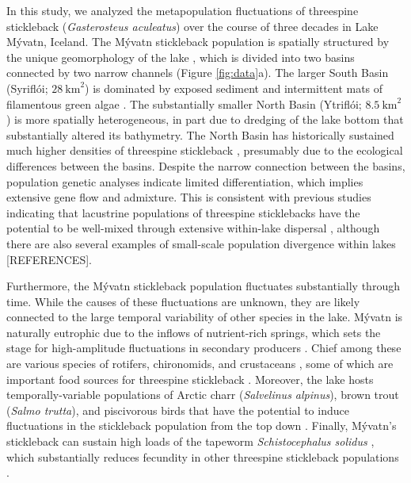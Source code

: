 \documentclass[11pt]{article}
\begin{document}
In this study, 
we analyzed the metapopulation fluctuations of threespine stickleback 
(\textit{Gasterosteus aculeatus})
over the course of three decades in Lake M\'{y}vatn, Iceland.
The M\'{y}vatn stickleback population is spatially structured by the unique geomorphology
of the lake \citep{gislason1998, millet2013}, 
which is divided into two basins connected by two narrow channels 
(Figure \ref{fig:data}a).
The larger South Basin (Sy{\dh}rifl\'{o}i; $28~\text{km}^2$)  
is dominated by exposed sediment and intermittent mats of filamentous green algae
\citep{einarsson2004myvatn}.
The substantially smaller North Basin (Ytrifl\'{o}i; $8.5~\text{km}^2$) 
is more spatially heterogeneous, 
in part due to dredging of the lake bottom
that substantially altered its bathymetry.
The North Basin has historically sustained much higher
densities of threespine stickleback  \citep{gislason1998}, 
presumably due to the ecological differences between the basins. 
Despite the narrow connection between the basins, 
population genetic \citep{millet2013} 
analyses indicate limited differentiation,
which implies extensive gene flow and admixture.
This is consistent with previous studies indicating that lacustrine populations
of threespine sticklebacks have the potential to be  
well-mixed through extensive within-lake dispersal
\citep{bolnick2009phenotype},
although there are also several examples of small-scale population divergence
within lakes [REFERENCES].

Furthermore, the M\'{y}vatn stickleback population fluctuates substantially through time.
While the causes of these fluctuations are unknown, 
they are likely connected to the large temporal variability 
of other species in the lake.
M\'{y}vatn is naturally eutrophic due to the inflows of nutrient-rich springs,
which sets the stage for high-amplitude fluctuations in secondary producers
\citep{einarsson2004myvatn}.
Chief among these are various species of rotifers, chironomids, and crustaceans
\citep{einarsson2002, einarsson2004clad, gardarsson2004population, ives2008},
some of which are important food sources for threespine stickleback
\citep{gudmundsson1996}.
Moreover, the lake hosts temporally-variable populations 
of Arctic charr (\textit{Salvelinus alpinus}), 
brown trout (\textit{Salmo trutta}), 
and piscivorous birds that have the potential 
to induce fluctuations in the stickleback population from the top down
\citep{gardarsson1979waterfowl, gudbergsson2004}.
Finally, M\'{y}vatn's stickleback can sustain high loads of the tapeworm
\textit{Schistocephalus solidus} \citep{gislason1998, karvonen2013},
which substantially reduces fecundity in other threespine stickleback populations 
\citep{heins2010evolutionary, heins2012fecundity}.
\end{document}
